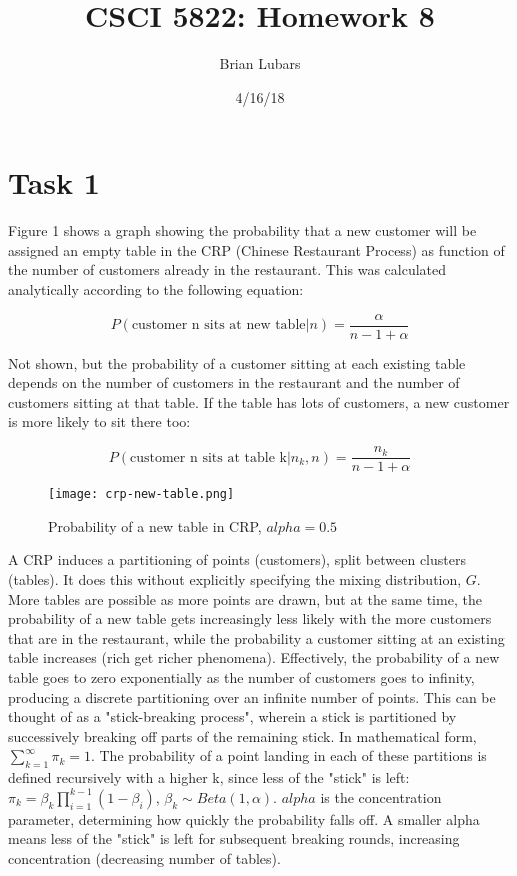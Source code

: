 \documentclass[letterpaper, 10pt]{article}
\title{CSCI 5822: Homework 8}
\author{Brian Lubars}
\date{4/16/18}
\begin{document}
\maketitle
\section{Task 1}

Figure 1 shows a graph showing the probability that a new customer will be assigned an empty table in the CRP (Chinese Restaurant Process) as function of the number of customers already in the restaurant. This was calculated analytically according to the following equation:

$$ P(\text{customer n sits at new table}|n) = \frac{\alpha}{n - 1 + \alpha} $$

Not shown, but the probability of a customer sitting at each existing table depends on the number of customers in the restaurant and the number of customers sitting at that table. If the table has lots of customers, a new customer is more likely to sit there too:

$$P(\text{customer n sits at table k}| n_k, n) = \frac{n_k}{n-1+\alpha}$$

\begin{figure}[h!]
    \texttt{[image: crp-new-table.png]}
    \label{1}
    \caption{Probability of a new table in CRP, $alpha = 0.5$}
\end{figure}

A CRP induces a partitioning of points (customers), split between clusters (tables). It does this without explicitly specifying the mixing distribution, $G$. More tables are possible as more points are drawn, but at the same time, the probability of a new table gets increasingly less likely with the more customers that are in the restaurant, while the probability a customer sitting at an existing table increases (rich get richer phenomena). Effectively, the probability of a new table goes to zero exponentially as the number of customers goes to infinity, producing a discrete partitioning over an infinite number of points. This can be thought of as a "stick-breaking process", wherein a stick is partitioned by successively breaking off parts of the remaining stick. In mathematical form, $\sum_{k=1}^{\infty} \pi_k = 1$. The probability of a point landing in each of these partitions is defined recursively with a higher k, since less of the "stick" is left: $\pi_k = \beta_k \prod_{i=1}^{k-1}(1 - \beta_i)$, $\beta_k \sim Beta(1, \alpha)$. $alpha$ is the concentration parameter, determining how quickly the probability falls off. A smaller alpha means less of the "stick" is left for subsequent breaking rounds, increasing concentration (decreasing number of tables). 
\end{document}
